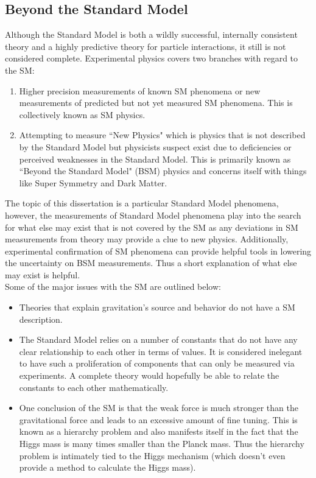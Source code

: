 \subsection {Beyond the Standard Model}
Although the Standard Model is both a wildly successful, internally consistent theory and a highly predictive theory for particle interactions, it still is not considered complete. Experimental physics covers two branches with regard to the SM:
\begin{enumerate}
\item Higher precision measurements of known SM phenomena or new measurements of predicted but not yet measured SM phenomena. This is collectively known as SM physics.
\item Attempting to measure ``New Physics" which is physics that is not described by the Standard Model but physicists suspect exist due to deficiencies or perceived weaknesses in the Standard Model. This is primarily known as ``Beyond the Standard Model" (BSM) physics and concerns itself with things like Super Symmetry and Dark Matter.
\end{enumerate}
The topic of this dissertation is a particular Standard Model phenomena, however, the measurements of Standard Model phenomena play into the search for what else may exist that is not covered by the SM as any deviations in SM measurements from theory may provide a clue to new physics. Additionally, experimental confirmation of SM phenomena can provide helpful tools in lowering the uncertainty on BSM measurements. Thus a short explanation of what else may exist is helpful.\\

Some of the major issues with the SM are outlined below:
\begin{itemize}
\item Theories that explain gravitation's source and behavior do not have a SM description.
\item The Standard Model relies on a number of constants that do not have any clear relationship to each other in terms of values. It is considered inelegant to have such a proliferation of components that can only be measured via experiments. A complete theory would hopefully be able to relate the constants to each other mathematically.
\item One conclusion of the SM is that the weak force is much stronger than the gravitational force and leads to an excessive amount of fine tuning. This is known as a hierarchy problem and also manifests itself in the fact that the Higgs mass is many times smaller than the Planck mass. Thus the hierarchy problem is intimately tied to the Higgs mechanism (which doesn't even provide a method to calculate the Higgs mass).
 \end{itemize}
 
